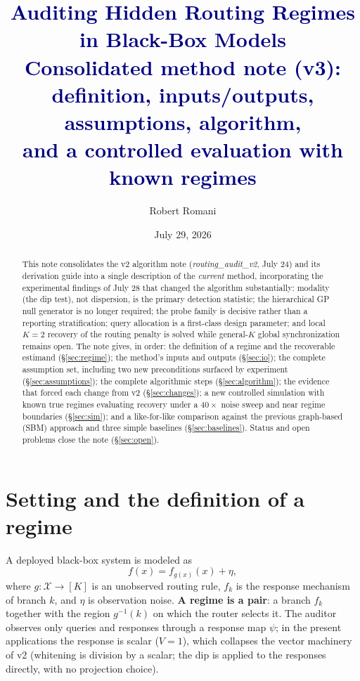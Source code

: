 \documentclass[11pt]{article}
\title{\textcolor{navy}{Auditing Hidden Routing Regimes in Black-Box Models\\
\large Consolidated method note (v3): definition, inputs/outputs, assumptions,
algorithm,\\ and a controlled evaluation with known regimes}}
\author{Robert Romani}
\date{July 29, 2026}
\begin{document}
\maketitle

\begin{abstract}
This note consolidates the v2 algorithm note (\emph{routing\_audit\_v2}, July 24) and its
derivation guide into a single description of the \emph{current} method, incorporating the
experimental findings of July 28 that changed the algorithm substantially: modality (the dip
test), not dispersion, is the primary detection statistic; the hierarchical GP null generator
is no longer required; the probe family is decisive rather than a reporting stratification;
query allocation is a first-class design parameter; and local $K{=}2$ recovery of the routing
penalty is solved while general-$K$ global synchronization remains open. The note gives, in
order: the definition of a regime and the recoverable estimand
(\S\ref{sec:regime}); the method's inputs and outputs (\S\ref{sec:io}); the complete
assumption set, including two new preconditions surfaced by experiment
(\S\ref{sec:assumptions}); the complete algorithmic steps (\S\ref{sec:algorithm}); the
evidence that forced each change from v2 (\S\ref{sec:changes}); a new controlled simulation
with known true regimes evaluating recovery under a $40\times$ noise sweep and near regime
boundaries (\S\ref{sec:sim}); and a like-for-like comparison against the previous graph-based
(SBM) approach and three simple baselines (\S\ref{sec:baselines}). Status and open problems
close the note (\S\ref{sec:open}).
\end{abstract}

\section{Setting and the definition of a regime}
\label{sec:regime}

A deployed black-box system is modeled as
\[
  f(x)=f_{g(x)}(x)+\eta,
\]
where $g:\mathcal X\to[K]$ is an unobserved routing rule, $f_k$ is the response mechanism of
branch $k$, and $\eta$ is observation noise. \textbf{A regime is a pair}: a branch $f_k$
together with the region $g^{-1}(k)$ on which the router selects it. The auditor observes
only queries and responses through a response map $\psi$; in the present applications the
response is scalar ($V=1$), which collapses the vector machinery of v2 (whitening is division
by a scalar; the dip is applied to the responses directly, with no projection choice).
\end{document}
